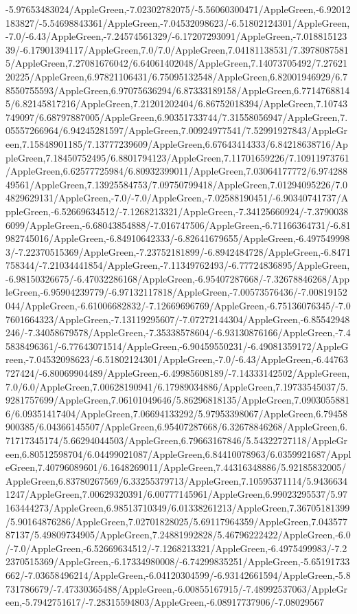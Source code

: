 {\begin{tikzternal}
-5.97653483024/AppleGreen,-7.02302782075/-5.56060300471/AppleGreen,-6.92012183827/-5.54698843361/AppleGreen,-7.04532098623/-6.51802124301/AppleGreen,-7.0/-6.43/AppleGreen,-7.24574561329/-6.17207293091/AppleGreen,-7.01881512339/-6.17901394117/AppleGreen,7.0/7.0/AppleGreen,7.04181138531/7.39780875815/AppleGreen,7.27081676042/6.64061402048/AppleGreen,7.14073705492/7.2762120225/AppleGreen,6.97821106431/6.75095132548/AppleGreen,6.82001946929/6.78550755593/AppleGreen,6.97075636294/6.87333189158/AppleGreen,6.77147688145/6.82145817216/AppleGreen,7.21201202404/6.86752018394/AppleGreen,7.10743749097/6.68797887005/AppleGreen,6.90351733744/7.31558056947/AppleGreen,7.05557266964/6.94245281597/AppleGreen,7.00924977541/7.52991927843/AppleGreen,7.15848901185/7.13777239609/AppleGreen,6.67643414333/6.84218638716/AppleGreen,7.18450752495/6.8801794123/AppleGreen,7.11701659226/7.10911973761/AppleGreen,6.62577725984/6.80932399011/AppleGreen,7.03064177772/6.97428849561/AppleGreen,7.13925584753/7.09750799418/AppleGreen,7.01294095226/7.04829629131/AppleGreen,-7.0/-7.0/AppleGreen,-7.02588190451/-6.90340741737/AppleGreen,-6.52669634512/-7.1268213321/AppleGreen,-7.34125660924/-7.37900386099/AppleGreen,-6.68043854888/-7.016747506/AppleGreen,-6.71166364731/-6.81982745016/AppleGreen,-6.84910642333/-6.82641679655/AppleGreen,-6.4975499983/-7.22370515369/AppleGreen,-7.23752181899/-6.8942484728/AppleGreen,-6.8471758344/-7.21034441854/AppleGreen,-7.11349762493/-6.77724836895/AppleGreen,-6.98150326675/-6.47032286168/AppleGreen,-6.95407287668/-7.32678846268/AppleGreen,-6.95904239779/-6.97132117818/AppleGreen,-7.00573576436/-7.00819152044/AppleGreen,-6.61006682832/-7.12669696769/AppleGreen,-6.75136076345/-7.07601664323/AppleGreen,-7.13119295607/-7.07272144304/AppleGreen,-6.85542948246/-7.34058679578/AppleGreen,-7.35338578604/-6.93130876166/AppleGreen,-7.45838496361/-6.77643071514/AppleGreen,-6.90459550231/-6.49081359172/AppleGreen,-7.04532098623/-6.51802124301/AppleGreen,-7.0/-6.43/AppleGreen,-6.44763727424/-6.80069904489/AppleGreen,-6.49985608189/-7.14333142502/AppleGreen,7.0/6.0/AppleGreen,7.00628190941/6.17989034886/AppleGreen,7.19733545037/5.9281757699/AppleGreen,7.06101049646/5.86296818135/AppleGreen,7.09030558816/6.09351417404/AppleGreen,7.06694133292/5.97953398067/AppleGreen,6.79458900385/6.04366145507/AppleGreen,6.95407287668/6.32678846268/AppleGreen,6.71717345174/5.66294044503/AppleGreen,6.79663167846/5.54322727118/AppleGreen,6.80512598704/6.04499021087/AppleGreen,6.84410078963/6.0359921687/AppleGreen,7.40796089601/6.1648269011/AppleGreen,7.44316348886/5.92185832005/AppleGreen,6.83780267569/6.33255379713/AppleGreen,7.10595371114/5.94366341247/AppleGreen,7.00629320391/6.00777145961/AppleGreen,6.99023295537/5.97163444273/AppleGreen,6.98513710349/6.01338261213/AppleGreen,7.36705181399/5.90164876286/AppleGreen,7.02701828025/5.69117964359/AppleGreen,7.04357787137/5.49809734905/AppleGreen,7.24881992828/5.46796222422/AppleGreen,-6.0/-7.0/AppleGreen,-6.52669634512/-7.1268213321/AppleGreen,-6.4975499983/-7.22370515369/AppleGreen,-6.17334980008/-6.74299835251/AppleGreen,-5.65191733662/-7.03658496214/AppleGreen,-6.04120304599/-6.93142661594/AppleGreen,-5.8731786679/-7.47330365488/AppleGreen,-6.00855167915/-7.48992537063/AppleGreen,-5.7942751617/-7.28315594803/AppleGreen,-6.08917737906/-7.08029567
\end{tikzternal}}
